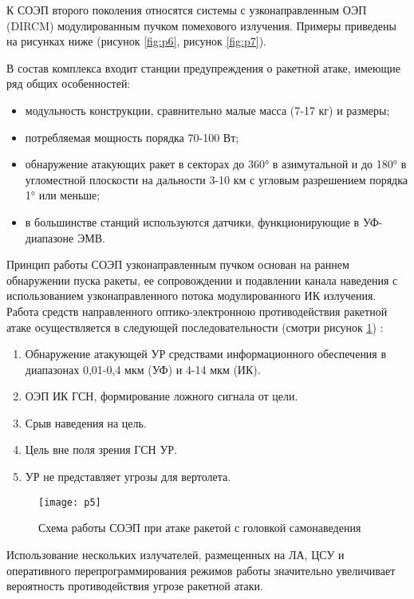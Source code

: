 К СОЭП второго поколения относятся системы с узконаправленным ОЭП (DIRCM) модулированным пучком помехового излучения. Примеры приведены на рисунках ниже (рисунок \ref{fig:p6}, рисунок \ref{fig:p7}).

В состав комплекса входит станции предупреждения о ракетной атаке, имеющие ряд общих особенностей:
\begin{itemize}
	\item модульность конструкции, сравнительно малые масса (7-17 кг) и размеры;
	\item потребляемая мощность порядка 70-100 Вт;
	\item обнаружение атакующих ракет в секторах до 360° в азимутальной и до 180° в угломестной плоскости на дальности 3-10 км с угловым разрешением порядка 1° или меньше;
	\item в большинстве станций используются датчики, функционирующие в УФ-диапазоне ЭМВ.
\end{itemize}

Принцип работы СОЭП узконаправленным пучком основан на раннем обнаружении пуска ракеты, ее сопровождении и подавлении канала наведения с использованием узконаправленного потока модулированного ИК излучения.  Работа средств направленного оптико-электронною противодействия ракетной атаке осуществляется в следующей последовательности (смотри рисунок \ref{fig:p5}) \cite[]{ForeignMilitary}:

\begin{enumerate}
	\item Обнаружение атакующей УР средствами информационного обеспечения в диапазонах 0,01-0,4 мкм (УФ) и 4-14 мкм (ИК).
	\item ОЭП ИК ГСН, формирование ложного сигнала от цели. 
	\item Срыв наведения на цель. 
	\item Цель вне поля зрения ГСН УР. 
	\item УР не представляет угрозы для вертолета.	
\end{enumerate}

\begin{figure}[ht]
	\centering
	\texttt{[image: p5]} 
	\caption{Схема работы СОЭП при атаке ракетой с головкой самонаведения}
	\label{fig:p5}
\end{figure}

Использование нескольких излучателей, размещенных на ЛА, ЦСУ и оперативного перепрограммирования режимов работы значительно увеличивает вероятность противодействия угрозе ракетной атаки.

